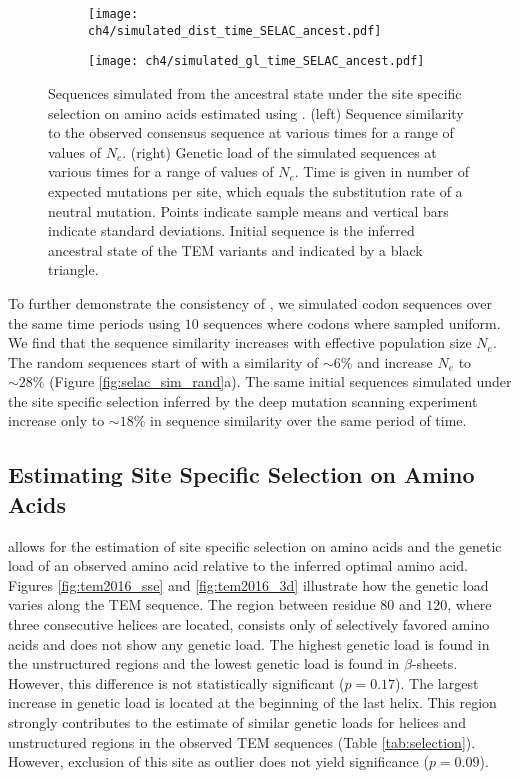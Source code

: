 \begin{figure}
    \centering
    \begin{subfigure}
        \centering
        \texttt{[image: ch4/simulated\_dist\_time\_SELAC\_ancest.pdf]}
    \end{subfigure}
    \begin{subfigure}
        \centering
        \texttt{[image: ch4/simulated\_gl\_time\_SELAC\_ancest.pdf]}
    \end{subfigure}
    \caption{Sequences simulated from the ancestral state under the site specific selection on amino acids estimated using \selac. 
    (left) Sequence similarity to the observed consensus sequence at various times for a range of values of $N_e$.
    (right) Genetic load of the simulated sequences at various times for a range of values of $N_e$.
    Time is given in number of expected mutations per site, which equals the substitution rate of a neutral mutation.
    Points indicate sample means and vertical bars indicate standard deviations. Initial sequence is the inferred ancestral state of the TEM variants and indicated by a black triangle.}
    \label{fig:selac_sim}
\end{figure}

To further demonstrate the consistency of \selac, we simulated codon sequences over the same time periods using $10$ sequences where codons where sampled uniform.
We find that the sequence similarity increases with effective population size $N_e$.
The random sequences start of with a similarity of $\sim6 \%$ and increase $N_e$ to $\sim28 \%$ (Figure \ref{fig:selac_sim_rand}a).
The same initial sequences simulated under the site specific selection inferred by the deep mutation scanning experiment increase only to $\sim18 \%$ in sequence similarity over the same period of time.


\subsection{Estimating Site Specific Selection on Amino Acids}
\selac allows for the estimation of site specific selection on amino acids and the genetic load of an observed amino acid relative to the inferred optimal amino acid.
Figures \ref{fig:tem2016_sse} and \ref{fig:tem2016_3d} illustrate how the genetic load varies along the TEM sequence.
The region between residue $80$ and $120$, where three consecutive helices are located, consists only of selectively favored amino acids and does not show any genetic load. 
The highest genetic load is found in the unstructured regions and the lowest genetic load is found in $\beta$-sheets.
However, this difference is not statistically significant ($p = 0.17$).
The largest increase in genetic load is located at the beginning of the last helix.
This region strongly contributes to the estimate of similar genetic loads for helices and unstructured regions in the observed TEM sequences (Table \ref{tab:selection}).
However, exclusion of this site as outlier does not yield significance ($p = 0.09$).


